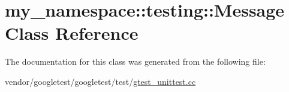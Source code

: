 \hypertarget{classmy__namespace_1_1testing_1_1Message}{}\section{my\+\_\+namespace\+:\+:testing\+:\+:Message Class Reference}
\label{classmy__namespace_1_1testing_1_1Message}


The documentation for this class was generated from the following file\+:\begin{DoxyCompactItemize}
\item 
vendor/googletest/googletest/test/\hyperlink{gtest__unittest_8cc}{gtest\+\_\+unittest.\+cc}\end{DoxyCompactItemize}

